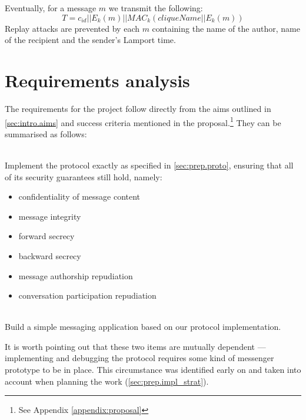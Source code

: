 \documentclass[a4paper, twoside, 12pt]{report}
\begin{document}
Eventually, for a message $m$ we transmit the following:
\begin{equation*}
    T = c_{id} || E_k(m) || MAC_k(cliqueName || E_k(m))
\end{equation*}
Replay attacks are prevented by each $m$ containing the name of the author, name of the recipient and the sender's Lamport time.

\section{Requirements analysis}
\label{sec:prep.requirements}
The requirements for the project follow directly from the aims outlined in \cref{sec:intro.aims} and success criteria mentioned in the proposal.\footnote{See Appendix \ref{appendix:proposal}} They can be summarised as follows:
\begin{description}[labelindent=0.5cm, leftmargin=1.3cm, rightmargin=0.5cm, topsep=2pt]
    \item[Implementing the protocol] \hfill \\
        Implement the protocol exactly as specified in \cref{sec:prep.proto}, ensuring that all of its security guarantees still hold, namely:
        \begin{itemize}[topsep=1pt, itemsep=2pt]
            \item confidentiality of message content
            \item message integrity
            \item forward secrecy
            \item backward secrecy
            \item message authorship repudiation
            \item conversation participation repudiation
        \end{itemize}


    \item[Constructing a useable messaging application] \hfill \\
        Build a simple messaging application based on our protocol implementation.    
\end{description}
\vspace{2pt}
It is worth pointing out that these two items are mutually dependent --- implementing and debugging the protocol requires some kind of messenger prototype to be in place. This circumstance was identified early on and taken into account when planning the work (\cref{sec:prep.impl_strat}). \\
\end{document}
